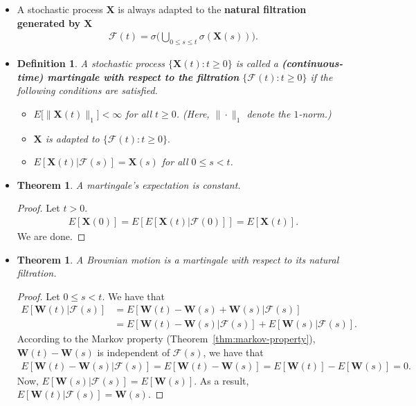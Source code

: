\documentclass[10pt]{article}
\newtheorem{theorem}[lemma]{Theorem}
\newtheorem{definition}[lemma]{Definition}
\newcommand{\ve}[1]{\mathbf{#1}}
\newcommand{\mcal}[1]{\mathcal{#1}}
\begin{document}
\begin{itemize}
  \item A stochastic process $\ve{X}$ is always adapted to the {\bf natural filtration generated by $\ve{X}$}
  \begin{align*}
    \mcal{F}(t) = \sigma\bigg( \bigcup_{0 \leq s \leq t} \sigma(\ve{X}(s))\bigg).
  \end{align*}

  \item \begin{definition}
    A stochastic process $\{ \ve{X}(t) : t \geq 0 \}$ is called a {\bf (continuous-time) martingale with respect to the filtration} $\{ \mcal{F}(t) : t \geq 0\}$ if the following conditions are satisfied.
    \begin{itemize}
      \item[(1)] $E\big[\|\ve{X}(t)\|_1\big] < \infty$ for all $t \geq 0$. (Here, $\| \cdot \|_1$ denote the $1$-norm.)
      \item[(2)] $\ve{X}$ is adapted to $\{ \mcal{F}(t) : t \geq 0 \}.$
      \item[(3)] $E[\ve{X}(t)|\mcal{F}(s)] = \ve{X}(s)$ for all $0 \leq s < t$.
    \end{itemize}
  \end{definition}

  \item \begin{theorem}
    A martingale's expectation is constant.
  \end{theorem}

  \begin{proof}
    Let $t > 0$.
    \begin{align*}
      E[\ve{X}(0)] = E[E[\ve{X}(t)|\mcal{F}(0)]] = E[\ve{X}(t)].
    \end{align*}
    We are done.
  \end{proof}

  \item \begin{theorem}
    A Brownian motion is a martingale with respect to its natural filtration.
  \end{theorem}
  \begin{proof}
    Let $0 \leq s < t$. We have that
    \begin{align*}
      E[\ve{W}(t)|\mcal{F}(s)]
      &= E[\ve{W}(t) - \ve{W}(s) + \ve{W}(s)|\mcal{F}(s)] \\
      &= E[\ve{W}(t) - \ve{W}(s)|\mcal{F}(s)] + E[\ve{W}(s)|\mcal{F}(s)].      
    \end{align*}
    According to the Markov property (Theorem~\ref{thm:markov-property}), $\ve{W}(t) - \ve{W}(s)$ is independent of $\mcal{F}(s)$, we have that
    \begin{align*}
      E[\ve{W}(t) - \ve{W}(s)|\mcal{F}(s)]
      = E[\ve{W}(t) - \ve{W}(s)]
      = E[\ve{W}(t)] - E[\ve{W}(s)]
      = 0.
    \end{align*}
    Now, $E[\ve{W}(s)|\mcal{F}(s)] = E[\ve{W}(s)]$. As a result, $E[\ve{W}(t)|\mcal{F}(s)] = \ve{W}(s)$.
  \end{proof}
\end{itemize}
\end{document}
